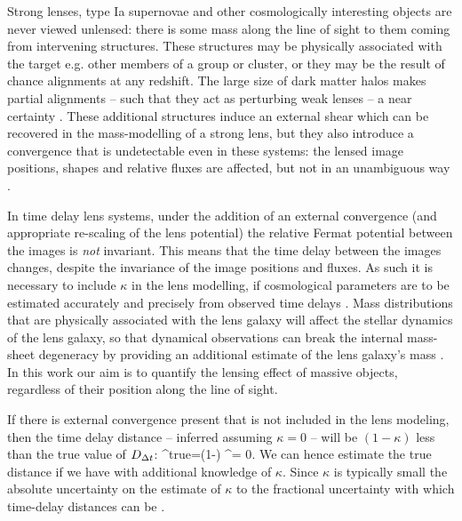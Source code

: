 \documentclass[useAMS,usenatbib]{mn2e}
\begin{document}
Strong lenses, type Ia supernovae and other cosmologically interesting objects
are never viewed unlensed: 
there is some mass along the line of sight to them coming from intervening
structures. These structures may be physically associated with the target
e.g. other members of a group or cluster, or they may be the result of
chance alignments at any redshift.  
The large size of dark
matter halos makes partial alignments -- such that they
act as perturbing weak lenses --  a near certainty
\citep{Vale+White2003,HilbertEtal2007}. These additional structures
induce an external shear which can be recovered in the mass-modelling of
a strong lens, but they also introduce a convergence that is undetectable even
in these systems:
the lensed image positions, shapes and relative fluxes are affected, but not
in an unambiguous way
\citep{FalcoEtal1985}.

In time delay lens systems, under the addition of an external convergence (and
appropriate re-scaling of the lens potential) the relative Fermat potential
between the images is {\it not} invariant. This means that the time delay
between the images changes, despite the invariance of the image positions and
fluxes. As such it is necessary to include $\kappa$ in the lens modelling, if
cosmological parameters are to be estimated accurately and precisely from
observed time delays \citep{SuyuEtal2010}. Mass distributions that are
physically associated with the lens galaxy will affect the stellar dynamics of
the lens galaxy, so that dynamical observations can break the internal
mass-sheet degeneracy by providing an additional estimate of the lens galaxy's
mass \citep[e.g.,][]{SuyuEtal2010}. In this work our aim is to quantify the
lensing effect of massive objects, regardless of their position along the line
of sight.

If there is external convergence present that is not included in the
lens modeling, then the time delay distance -- inferred assuming $\kappa
= 0$ -- will be $(1-\kappa)$ less than the true value of $D_{\Delta t}$:
\be 
\label{eq:MassSheet:Dtbias}
\Dt^{\rm{true}}=(1-\kappa) \Dt^{{\kappax = 0}}.
\ee
We can hence estimate the true distance if we have  with additional
knowledge of $\kappa$. Since $\kappa$ is typically small the absolute
uncertainty on the estimate of $\kappa$ \correspends to the fractional
uncertainty with which time-delay distances can be \infered.
\end{document}
